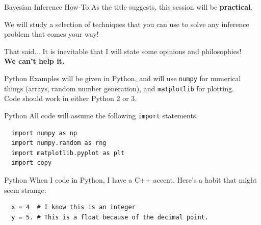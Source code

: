 
\begin{frame}[t,plain]
\titlepage
\end{frame}

\begin{frame}[t]{Bayesian Inference How-To}
As the title suggests, this session will be {\bf practical}.
\vspace{1cm}

We will study a selection of techniques that you can use to solve any
inference problem that comes your way!
\end{frame}

\begin{frame}[t]{That said...}
It is inevitable that I will state some opinions and philosophies!\\
{\bf We can't help it.}
\end{frame}

\begin{frame}[t]{Python}
Examples will be given in Python, and will use {\tt numpy} for numerical
things (arrays, random number generation), and {\tt matplotlib} for plotting.\\
\vspace{1cm}
Code should work in either Python 2 or 3.
\end{frame}

\begin{frame}[t, fragile]{Python}
All code will assume the following {\tt import} statements.
\begin{verbatim}
  import numpy as np
  import numpy.random as rng
  import matplotlib.pyplot as plt
  import copy
\end{verbatim}
\end{frame}


\begin{frame}[t, fragile]{Python}
When I code in Python, I have a C++ accent. Here's a habit that might
seem strange:

\begin{verbatim}
  x = 4  # I know this is an integer
  y = 5. # This is a float because of the decimal point.
\end{verbatim}
\end{frame}


